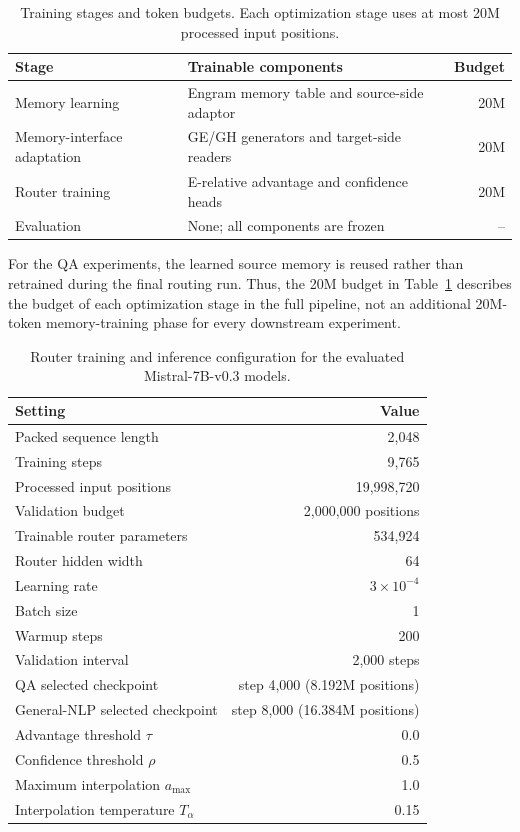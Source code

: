 \begin{table}[t]
\centering
\caption{
Training stages and token budgets. Each optimization stage uses at most
20M processed input positions.
}
\label{tab:tokenbudget}
\small
\setlength{\tabcolsep}{5pt}
\begin{tabularx}{\linewidth}{@{}lXr@{}}
\toprule
\textbf{Stage} & \textbf{Trainable components} & \textbf{Budget} \\
\midrule
Memory learning
& Engram memory table and source-side adaptor
& 20M \\

Memory-interface adaptation
& GE/GH generators and target-side readers
& 20M \\

Router training
& E-relative advantage and confidence heads
& 20M \\

Evaluation
& None; all components are frozen
& -- \\
\bottomrule
\end{tabularx}
\end{table}

For the QA experiments, the learned source memory is reused rather than
retrained during the final routing run. Thus, the 20M budget in
Table~\ref{tab:tokenbudget} describes the budget of each optimization stage in
the full pipeline, not an additional 20M-token memory-training phase for every
downstream experiment.

\begin{table}[t]
\centering
\caption{
Router training and inference configuration for the evaluated
Mistral-7B-v0.3 models.
}
\label{tab:routerconfig}
\small
\setlength{\tabcolsep}{6pt}
\begin{tabularx}{\linewidth}{@{}Xr@{}}
\toprule
\textbf{Setting} & \textbf{Value} \\
\midrule
Packed sequence length & 2,048 \\
Training steps & 9,765 \\
Processed input positions & 19,998,720 \\
Validation budget & 2,000,000 positions \\
Trainable router parameters & 534,924 \\
Router hidden width & 64 \\
Learning rate & $3\times10^{-4}$ \\
Batch size & 1 \\
Warmup steps & 200 \\
Validation interval & 2,000 steps \\
\addlinespace
QA selected checkpoint
& step 4,000 (8.192M positions) \\
General-NLP selected checkpoint
& step 8,000 (16.384M positions) \\
\addlinespace
Advantage threshold $\tau$ & 0.0 \\
Confidence threshold $\rho$ & 0.5 \\
Maximum interpolation $a_{\max}$ & 1.0 \\
Interpolation temperature $T_{\alpha}$ & 0.15 \\
\bottomrule
\end{tabularx}
\end{table}

